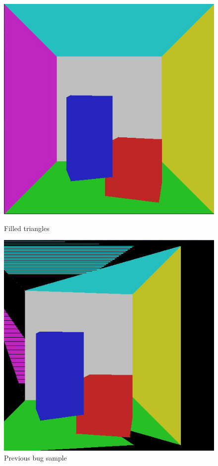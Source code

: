 \begin{figure}[H]
\centering
{}
    \centering
    \includegraphics[width=\linewidth]{img/colors.jpg}
    \caption{Filled triangles}
    \label{fig:colors}
\endminipage
{}
    \centering
    \includegraphics[width=\linewidth]{img/colors_bug.jpg}
    \caption{Previous bug sample}
    \label{fig:colors_bug}
\endminipage
\end{figure}


